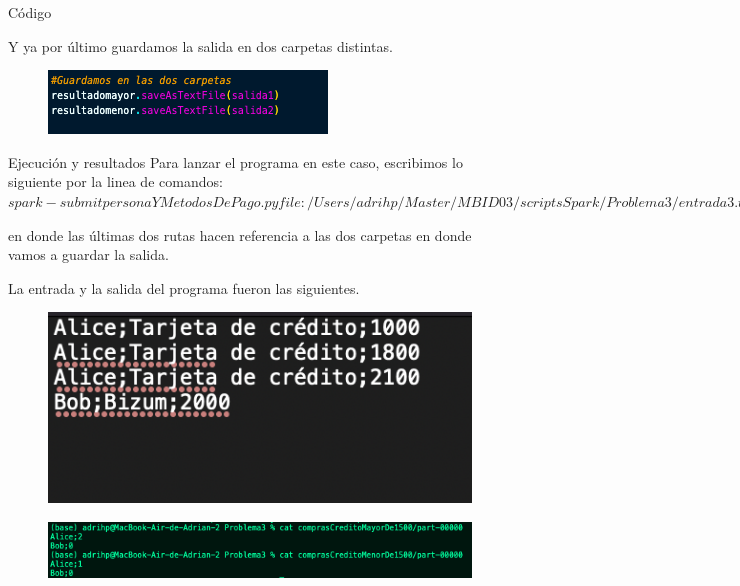 \documentclass[a4paper]{article}
\begin{document}
\begin{section}{Código}
\begin{figure}[h]
\end{figure}
\clearpage

    Y ya por último guardamos la salida en dos carpetas distintas.
    \begin{figure}[h]
        \centering
        \includegraphics[width=\textwidth, keepaspectratio]{codigo3}
    \end{figure}
\end{section}

\begin{section}{Ejecución y resultados}
    Para lanzar el programa en este caso, escribimos lo siguiente por la linea de comandos: 
    $spark-submit personaYMetodosDePago.py file:/Users/adrihp/Master/MBID03/scriptsSpark/Problema3/entrada3.txt 
    file:/Users/adrihp/Master/MBID03/scriptsSpark/Problema3/comprasCreditoMayorDe1500 file:/Users/adrihp/Master/MBID03/scriptsSpark/Problema3/comprasCreditoMenorDe1500$

    en donde las últimas dos rutas hacen referencia a las dos carpetas en donde vamos a guardar la salida.

    La entrada y la salida del programa fueron las siguientes.
    \begin{figure}[h]
        \centering
        \includegraphics[width=\textwidth, keepaspectratio]{entrada3.png}
    \end{figure}
    \begin{figure}[h]
        \centering
        \includegraphics[width=\textwidth, keepaspectratio]{salida3.png}
    \end{figure}
    
\end{section}
\end{document}
